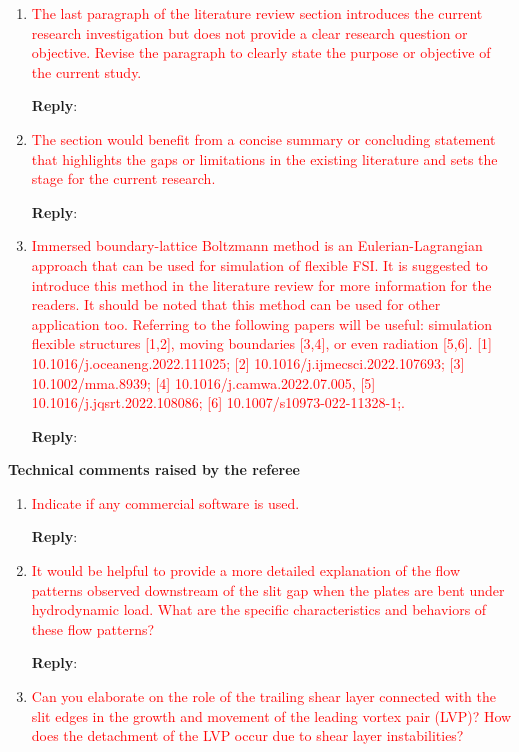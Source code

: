 \documentclass[onecolumn,a4paper,amsmath,amssym,pre]{revtex4}
\begin{document}
{\begin{enumerate}
\textbf{Reply}:

\item \textcolor{red}{The last paragraph of the literature review section introduces the current research investigation but does not provide a clear research question or objective. Revise the paragraph to clearly state the purpose or objective of the current study.}

\textbf{Reply}:

\item \textcolor{red}{The section would benefit from a concise summary or concluding statement that highlights the gaps or limitations in the existing literature and sets the stage for the current research.}

\textbf{Reply}:

\item \textcolor{red}{Immersed boundary-lattice Boltzmann method is an Eulerian-Lagrangian approach that can be used for simulation of flexible FSI. It is suggested to introduce this method in the literature review for more information for the readers. It should be noted that this method can be used for other application too. Referring to the following papers will be useful: simulation flexible structures [1,2], moving boundaries [3,4], or even radiation [5,6]. [1] 10.1016/j.oceaneng.2022.111025; [2] 10.1016/j.ijmecsci.2022.107693; [3] 10.1002/mma.8939; [4] 10.1016/j.camwa.2022.07.005, [5] 10.1016/j.jqsrt.2022.108086; [6] 10.1007/s10973-022-11328-1;.}

\textbf{Reply}:

\end{enumerate}	

\textbf{Technical comments raised by the referee}

\begin{enumerate}
\item \textcolor{red}{Indicate if any commercial software is used.}

\textbf{Reply}:

\item \textcolor{red}{It would be helpful to provide a more detailed explanation of the flow patterns observed downstream of the slit gap when the plates are bent under hydrodynamic load. What are the specific characteristics and behaviors of these flow patterns?}

\textbf{Reply}:

\item \textcolor{red}{Can you elaborate on the role of the trailing shear layer connected with the slit edges in the growth and movement of the leading vortex pair (LVP)? How does the detachment of the LVP occur due to shear layer instabilities?}


\end{enumerate}}
\end{document}
